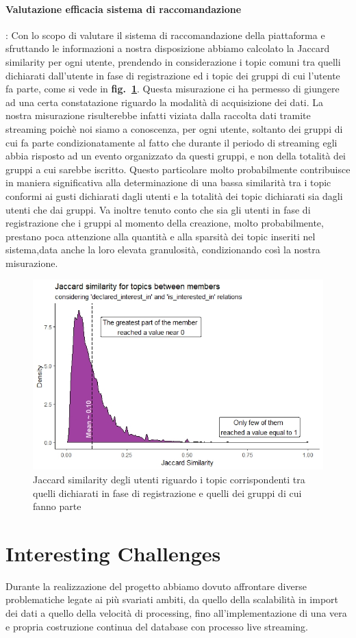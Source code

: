 \documentclass[fleqn,10pt]{SelfArx} %
\begin{document}
{\paragraph{Valutazione efficacia sistema di raccomandazione}:
Con lo scopo di valutare il sistema di raccomandazione della piattaforma e sfruttando le informazioni a nostra disposizione abbiamo calcolato la Jaccard similarity per ogni utente, prendendo in considerazione i topic comuni tra quelli dichiarati dall'utente in fase di registrazione ed i topic dei gruppi di cui l'utente fa parte, come si vede in \textbf{fig.~\ref{jaccard_similarity}}. 
Questa misurazione ci ha permesso di giungere ad una certa constatazione riguardo la modalità di acquisizione dei dati. 
La nostra misurazione risulterebbe infatti viziata dalla raccolta dati tramite streaming poichè noi siamo a conoscenza, per ogni utente, soltanto dei gruppi di cui fa parte condizionatamente al fatto che durante il periodo di streaming egli abbia risposto ad un evento organizzato da questi gruppi, e non della totalità dei gruppi a cui sarebbe iscritto. 
Questo particolare molto probabilmente contribuisce in maniera significativa alla determinazione di una bassa similarità tra i topic conformi ai gusti dichiarati dagli utenti e la totalità dei topic dichiarati sia dagli utenti che dai gruppi. 
Va inoltre tenuto conto che sia gli utenti in fase di registrazione che i gruppi al momento della creazione, molto probabilmente, prestano poca attenzione alla quantità e alla sparsità dei topic inseriti nel sistema,data anche la loro elevata granulosità, condizionando così la nostra misurazione. 
\begin{figure}
\centering
\includegraphics[width = 8.7 cm, height = 5 cm]{jaccard_similarity.jpeg}
\caption{\label{jaccard_similarity} Jaccard similarity degli utenti riguardo i topic corrispondenti tra quelli dichiarati in fase di registrazione e quelli dei gruppi di cui fanno parte}
\end{figure}
\section*{Interesting Challenges}
{\small
Durante la realizzazione del progetto abbiamo dovuto affrontare diverse problematiche legate ai più svariati ambiti, da quello della scalabilità in import dei dati a quello della velocità di processing, fino all'implementazione di una vera e propria costruzione continua del database con processo live streaming.
}}
\end{document}
